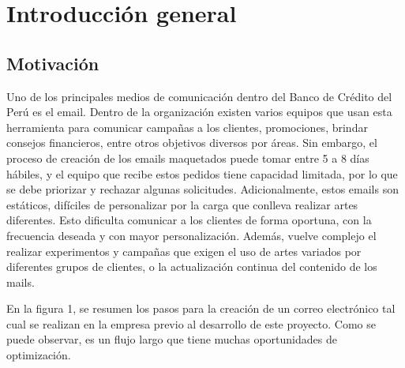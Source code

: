 
\chapter{Introducción general} %

\label{Chapter1} %
\label{IntroGeneral}


\newcommand{\keyword}[1]{\textbf{#1}}
\newcommand{\tabhead}[1]{\textbf{#1}}
\newcommand{\code}[1]{\texttt{#1}}
\newcommand{\file}[1]{\texttt{\bfseries#1}}
\newcommand{\option}[1]{\texttt{\itshape#1}}
\newcommand{\grados}{$^{\circ}$}



\section{Motivación}

Uno de los principales medios de comunicación dentro del Banco de Crédito del Perú es el email. Dentro de la organización existen varios equipos que usan esta herramienta para comunicar campañas a los clientes, promociones, brindar consejos financieros, entre otros objetivos diversos por áreas. Sin embargo, el proceso de creación de los emails maquetados puede tomar entre 5 a 8 días hábiles, y el equipo que recibe estos pedidos tiene capacidad limitada, por lo que se debe priorizar y rechazar algunas solicitudes. Adicionalmente, estos emails son estáticos, difíciles de personalizar por la carga que conlleva realizar artes diferentes. Esto dificulta comunicar a los clientes de forma oportuna, con la frecuencia deseada y con mayor personalización. Además, vuelve complejo el realizar experimentos y campañas que exigen el uso de artes variados por diferentes grupos de clientes, o la actualización continua del contenido de los mails. 

En la figura 1, se resumen los pasos para la creación de un correo electrónico tal cual se realizan en la empresa previo al desarrollo de este proyecto. Como se puede observar, es un flujo largo que tiene muchas oportunidades de optimización.


